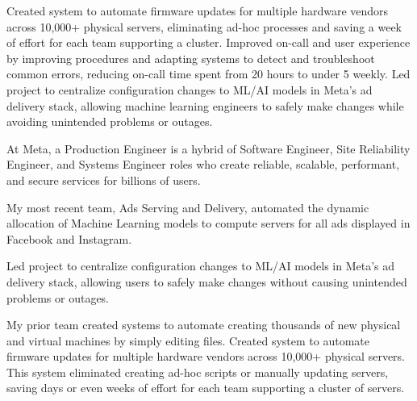 \documentclass[MMMMyyyy,nonstopmode]{simpleresumecv_stacked}
\begin{document}
\begin{Body}
\begin{Detail}
\Gap 

\BulletItem
	Created system to automate firmware updates for multiple hardware vendors across 10,000+ physical servers, eliminating ad-hoc processes and saving a week of effort for each team supporting a cluster.
\BulletItem
	Improved on-call and user experience by improving procedures and adapting systems to detect and troubleshoot common errors, reducing on-call time spent from 20 hours to under 5 weekly.
\BulletItem
	Led project to centralize configuration changes to ML/AI models in Meta’s ad delivery stack, allowing machine learning engineers to safely make changes while avoiding unintended problems or outages.

\iffalse 	%

At Meta, a Production Engineer is a hybrid of Software Engineer, Site Reliability Engineer, and Systems Engineer roles
who create reliable, scalable, performant, and secure services for billions of users.

\Gap

My most recent team, Ads Serving and Delivery, automated the dynamic allocation of Machine Learning models to compute servers for all ads displayed in Facebook and Instagram.

\BulletItem
Led project to centralize configuration changes to ML/AI models in Meta's ad delivery stack, allowing users to safely make changes without causing unintended problems or outages.

\Gap
My prior team created systems to automate creating thousands of new physical and virtual machines by simply editing files. 
\BulletItem
Created system to automate firmware updates for multiple hardware vendors across 10,000+ physical servers. 
This system eliminated creating ad-hoc scripts or manually updating servers, saving days or even weeks of effort for each team supporting a cluster of servers.


\end{Detail}
\end{Body}
\end{document}
